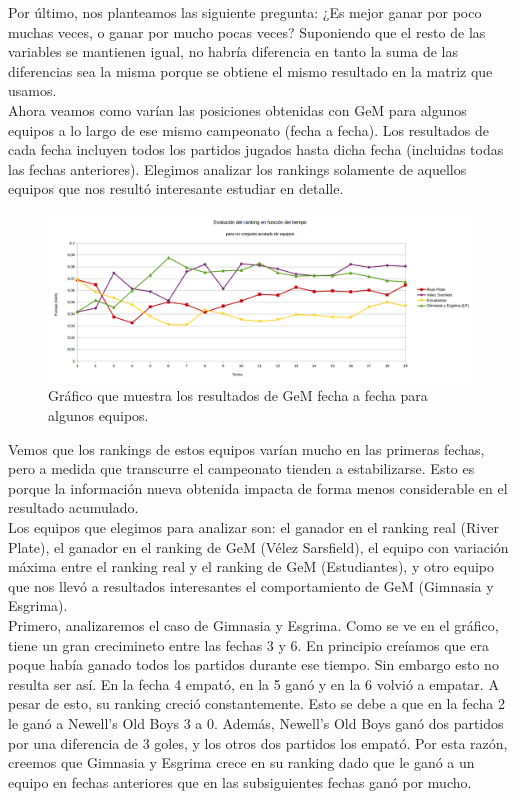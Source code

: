 Por último, nos planteamos las siguiente pregunta: ¿Es mejor ganar por poco muchas veces, o ganar por mucho pocas veces? Suponiendo que el resto de las variables se mantienen igual, no habría diferencia en tanto la suma de las diferencias sea la misma porque se obtiene el mismo resultado en la matriz que usamos.
\\
Ahora veamos como varían las posiciones obtenidas con GeM para algunos equipos a lo largo de ese mismo campeonato (fecha a fecha). Los resultados de cada fecha incluyen todos los partidos jugados hasta dicha fecha (incluidas todas las fechas anteriores).
Elegimos analizar los rankings solamente de aquellos equipos que nos resultó interesante estudiar en detalle.

\begin{figure}[H]
  \includegraphics[scale=0.449]{imagenes/gemfechas2.png}
   \caption{Gráfico que muestra los resultados de GeM fecha a fecha para algunos equipos.}
  \label{fig:img1}
\end{figure}

Vemos que los rankings de estos equipos varían mucho en las primeras fechas, pero a medida que transcurre el campeonato tienden a estabilizarse. Esto es porque la información nueva obtenida impacta de forma menos considerable en el resultado acumulado.\\

Los equipos que elegimos para analizar son: el ganador en el ranking real (River Plate), el ganador en el ranking de GeM (Vélez Sarsfield), el equipo con variación máxima entre el ranking real y el ranking de GeM (Estudiantes), y otro equipo que nos llevó a resultados interesantes el comportamiento de GeM (Gimnasia y Esgrima).\\

Primero, analizaremos el caso de Gimnasia y Esgrima. Como se ve en el gráfico, tiene un gran crecimineto entre las fechas 3 y 6. En principio creíamos que era poque había ganado todos los partidos durante ese tiempo. Sin embargo esto no resulta ser así. En la fecha 4 empató, en la 5 ganó y en la 6 volvió a empatar. A pesar de esto, su ranking creció constantemente. Esto se debe a que en la fecha 2 le ganó a Newell's Old Boys 3 a 0. Además, Newell's Old Boys ganó dos partidos por una diferencia de 3 goles, y los otros dos partidos los empató. Por esta razón, creemos que Gimnasia y Esgrima crece en su ranking dado que le ganó a un equipo en fechas anteriores que en las subsiguientes fechas ganó por mucho. \\

